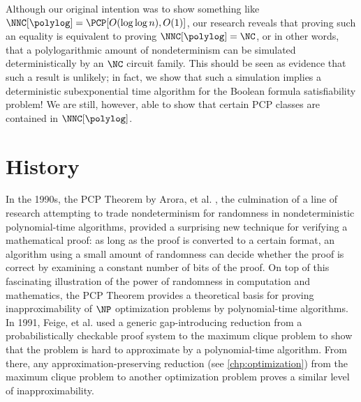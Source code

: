 %
%
%
Although our original intention was to show something like $\NNC[\polylog] = \PCP[O(\loglog n), O(1)]$, our research reveals that proving such an equality is equivalent to proving $\NNC[\polylog] = \NC$, or in other words, that a polylogarithmic amount of nondeterminism can be simulated deterministically by an $\NC$ circuit family.
This should be seen as evidence that such a result is unlikely; in fact, we show that such a simulation implies a deterministic subexponential time algorithm for the Boolean formula satisfiability problem!
We are still, however, able to show that certain PCP classes are contained in $\NNC[\polylog]$.

%
%


\section{History}

In the 1990s, the PCP Theorem by Arora, et al. \autocite{almss92}, the culmination of a line of research attempting to trade nondeterminism for randomness in nondeterministic polynomial-time algorithms, provided a surprising new technique for verifying a mathematical proof: as long as the proof is converted to a certain format, an algorithm using a small amount of randomness can decide whether the proof is correct by examining a constant number of bits of the proof.
On top of this fascinating illustration of the power of randomness in computation and mathematics, the PCP Theorem provides a theoretical basis for proving inapproximability of $\NP$ optimization problems by polynomial-time algorithms.
In 1991, Feige, et al. \autocite{fglss91} used a generic gap-introducing reduction from a probabilistically checkable proof system to the maximum clique problem to show that the problem is hard to approximate by a polynomial-time algorithm.
From there, any approximation-preserving reduction (see \autoref{chp:optimization}) from the maximum clique problem to another optimization problem proves a similar level of inapproximability.

